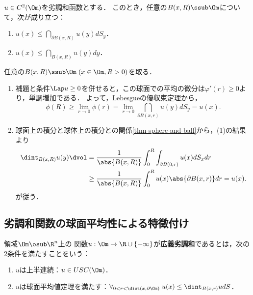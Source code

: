 \documentclass[uplatex,dvipdfmx]{jsreport}
\begin{document}
\begin{theorem}[劣調和関数の平均定理]\label{thm-mean-value-theorem-of-subharmonic-function}
    $u\in C^2(\Om)$を劣調和函数とする．
    このとき，任意の$B(x,R)\ssub\Om$について，次が成り立つ：
    \begin{enumerate}
        \item $u(x)\le\dint_{\partial B(x,R)}u(y)dS_y$．
        \item $u(x)\le\dint_{B(x,R)}u(y)dy$．
    \end{enumerate}
\end{theorem}
\begin{Proof}
    任意の$B(x,R)\ssub\Om\;(x\in\Om,R>0)$を取る．
    \begin{enumerate}
        \item 補題と条件$\Lap u\ge0$を併せると，この球面での平均の微分は$\varphi'(r)\ge0$より，単調増加である．
        よって，Lebesgueの優収束定理から，
        \[\phi(R)\ge\lim_{r\to0}\phi(r)=\lim_{r\to0}\dint_{\partial B(x,r)}u(y)dS_y=u(x).\]
        \item 球面上の積分と球体上の積分との関係\ref{thm-sphere-and-ball}から，(1)の結果より
        \begin{align*}
            \dint_{B(x,R)}u(y)\dvol&=\frac{1}{\abs{B(x,R)}}\int^R_0\int_{\partial B(0,r)}u(x)dS_xdr\\
            &\ge\frac{1}{\abs{B(x,R)}}\int^R_0u(x)\abs{\partial B(x,r)}dr=u(x).
        \end{align*}
        が従う．
    \end{enumerate}
\end{Proof}

\subsection{劣調和関数の球面平均性による特徴付け}

\begin{definition}
    領域$\Om\osub\R^n$上の
    関数$u:\Om\to\R\cup\{-\infty\}$が\textbf{広義劣調和}であるとは，次の2条件を満たすことをいう：
    \begin{enumerate}
        \item $u$は上半連続：$u\in USC(\Om)$．
        \item $u$は球面平均値定理を満たす：$\forall_{0<r<\dist(x,\partial\Om)}\;u(x)\le\dint_{B(x,r)}udS$．
    \end{enumerate}
\end{definition}
\end{document}
